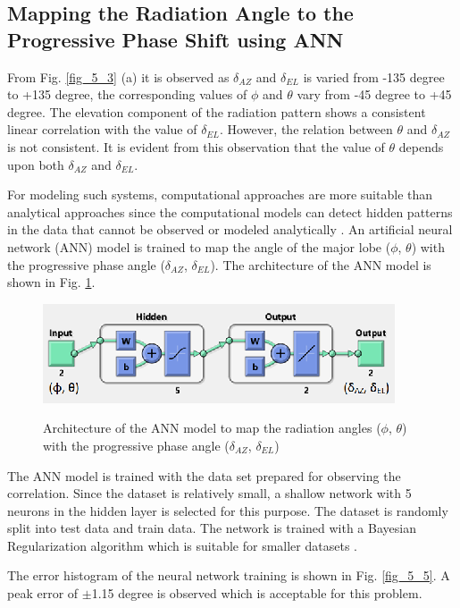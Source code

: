 \subsection{Mapping the Radiation Angle to the Progressive Phase Shift using ANN}
From Fig. \ref{fig_5_3} (a) it is observed as $\delta_{AZ}$ and $\delta_{EL}$ is varied from -135 degree to +135 degree, the corresponding values of $\phi$ and $\theta$ vary from -45 degree to +45 degree. The elevation component of the radiation pattern shows a consistent linear correlation with the value of $\delta_{EL}$. However, the relation between $\theta$ and $\delta_{AZ}$ is not consistent. It is evident from this observation that the value of $\theta$ depends upon both $\delta_{AZ}$ and $\delta_{EL}$.

For modeling such systems, computational approaches are more suitable than analytical approaches since the computational models can detect hidden patterns in the data that cannot be observed or modeled analytically \cite{simDrivOptBook}. An artificial neural network (ANN) model is trained to map the angle of the major lobe ($\phi$, $\theta$) with the progressive phase angle ($\delta_{AZ}$, $\delta_{EL}$). The architecture of the ANN model is shown in Fig. \ref{fig_5_4}.

\begin{figure}
  \centering
  \includegraphics[width=0.6\linewidth]{Fig-naun_4.eps}\\
  \caption{Architecture of the ANN model to map the radiation angles ($\phi$, $\theta$) with the progressive phase angle ($\delta_{AZ}$, $\delta_{EL}$)} \label{fig_5_4}
\end{figure}

The ANN model is trained with the data set prepared for observing the correlation. Since the dataset is relatively small, a shallow network with 5 neurons in the hidden layer is selected for this purpose. The dataset is randomly split into test data and train data. The network is trained with a Bayesian Regularization algorithm which is suitable for smaller datasets \cite{bayesian_regularization, kumaresh_surrgoate}.

The error histogram of the neural network training is shown in Fig. \ref{fig_5_5}. A peak error of $\pm$1.15 degree is observed which is acceptable for this problem.

